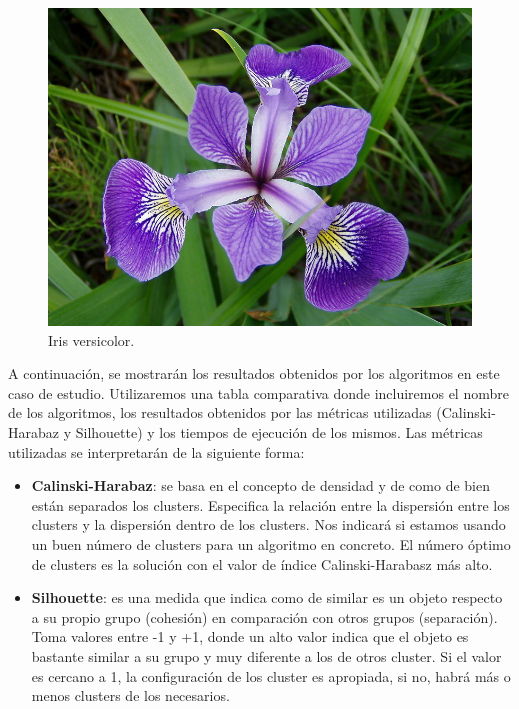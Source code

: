 \documentclass[a4paper, 20pt]{article}
\begin{document}
\begin{figure}[h]
  \begin{minipage}[h]{0.31\textwidth}
    \includegraphics[width=\textwidth]{dani/versicolor.jpg}
    \caption{Iris versicolor.}
  \end{minipage}
\end{figure}

A continuación, se mostrarán los resultados obtenidos por los algoritmos en este caso de estudio. Utilizaremos una tabla comparativa donde incluiremos el nombre de los algoritmos, los resultados obtenidos por las métricas utilizadas (Calinski-Harabaz y Silhouette) y los tiempos de ejecución de los mismos. Las métricas utilizadas se interpretarán de la siguiente forma:

\begin{itemize}
\item \textbf{Calinski-Harabaz}: se basa en el concepto de densidad y de como de bien están separados los clusters. Especifica la relación entre la dispersión entre los clusters y la dispersión dentro de los clusters. Nos indicará si estamos usando un buen número de clusters para un algoritmo en concreto. El número óptimo de clusters es la solución con el valor de índice Calinski-Harabasz más alto.
\item \textbf{Silhouette}: es una medida que indica como de similar es un objeto respecto a su propio grupo (cohesión) en comparación con otros grupos (separación). Toma valores entre -1 y +1, donde un alto valor indica que el objeto es bastante similar a su grupo y muy diferente a los de otros cluster. Si el valor es cercano a 1, la configuración de los cluster es apropiada, si no, habrá más o menos clusters de los necesarios.
\end{itemize}
\end{document}
